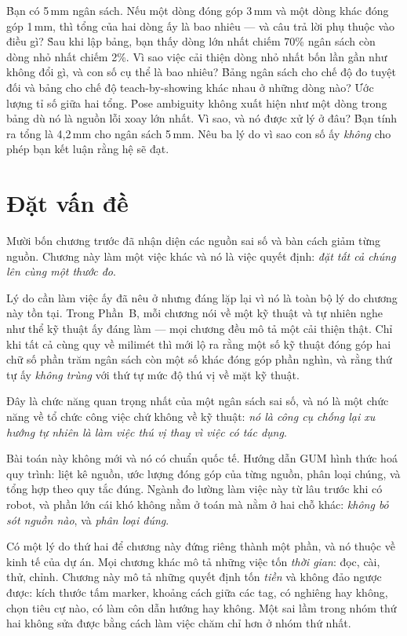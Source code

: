 \documentclass[../../marker.tex]{subfiles}
\begin{document}
\begin{khoigoi}
\h{Bạn có 5\,mm ngân sách. Nếu một dòng đóng góp 3\,mm và một dòng khác đóng góp 1\,mm, thì tổng của hai dòng ấy là bao nhiêu --- và câu trả lời phụ thuộc vào điều gì?}
\h{Sau khi lập bảng, bạn thấy dòng lớn nhất chiếm 70\% ngân sách còn dòng nhỏ nhất chiếm 2\%. Vì sao việc cải thiện dòng nhỏ nhất bốn lần gần như không đổi gì, và con số cụ thể là bao nhiêu?}
\h{Bảng ngân sách cho chế độ đo tuyệt đối và bảng cho chế độ teach-by-showing khác nhau ở những dòng nào? Ước lượng tỉ số giữa hai tổng.}
\h{Pose ambiguity không xuất hiện như một dòng trong bảng dù nó là nguồn lỗi xoay lớn nhất. Vì sao, và nó được xử lý ở đâu?}
\h{Bạn tính ra tổng là 4,2\,mm cho ngân sách 5\,mm. Nêu ba lý do vì sao con số ấy \emph{không} cho phép bạn kết luận rằng hệ sẽ đạt.}
\end{khoigoi}

\section{Đặt vấn đề}

Mười bốn chương trước đã nhận diện các nguồn sai số và bàn cách giảm từng nguồn. Chương này làm một việc khác và nó là việc quyết định: \emph{đặt tất cả chúng lên cùng một thước đo}.

Lý do cần làm việc ấy đã nêu ở  nhưng đáng lặp lại vì nó là toàn bộ lý do chương này tồn tại. Trong Phần~B, mỗi chương nói về một kỹ thuật và tự nhiên nghe như thể kỹ thuật ấy đáng làm --- mọi chương đều mô tả một cải thiện thật. Chỉ khi tất cả cùng quy về milimét thì mới lộ ra rằng một số kỹ thuật đóng góp hai chữ số phần trăm ngân sách còn một số khác đóng góp phần nghìn, và rằng thứ tự ấy \emph{không trùng} với thứ tự mức độ thú vị về mặt kỹ thuật.

Đây là chức năng quan trọng nhất của một ngân sách sai số, và nó là một chức năng về tổ chức công việc chứ không về kỹ thuật: \emph{nó là công cụ chống lại xu hướng tự nhiên là làm việc thú vị thay vì việc có tác dụng}.

Bài toán này không mới và nó có chuẩn quốc tế. Hướng dẫn GUM \cite{jcgm2008gum} hình thức hoá quy trình: liệt kê nguồn, ước lượng đóng góp của từng nguồn, phân loại chúng, và tổng hợp theo quy tắc đúng. Ngành đo lường làm việc này từ lâu trước khi có robot, và phần lớn cái khó không nằm ở toán mà nằm ở hai chỗ khác: \emph{không bỏ sót nguồn nào}, và \emph{phân loại đúng}.

Có một lý do thứ hai để chương này đứng riêng thành một phần, và nó thuộc về kinh tế của dự án. Mọi chương khác mô tả những việc tốn \emph{thời gian}: đọc, cài, thử, chỉnh. Chương này mô tả những quyết định tốn \emph{tiền} và không đảo ngược được: kích thước tấm marker, khoảng cách giữa các tag, có nghiêng hay không, chọn tiêu cự nào, có làm côn dẫn hướng hay không. Một sai lầm trong nhóm thứ hai không sửa được bằng cách làm việc chăm chỉ hơn ở nhóm thứ nhất.
\end{document}
